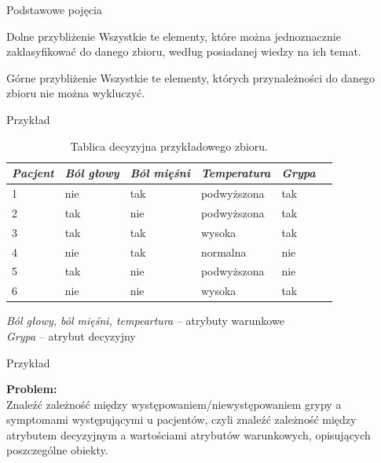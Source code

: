 \documentclass[10pt]{beamer}
\begin{document}
\begin{frame}{Podstawowe pojęcia}
\begin{spacing}{1.2}
\begin{block}{Dolne przybliżenie}
Wszystkie te elementy, które można jednoznacznie zaklasyfikować do danego zbioru, według posiadanej wiedzy na ich temat.
\end{block}

\begin{block}{Górne przybliżenie}
Wszystkie te elementy, których przynależności do danego zbioru nie można wykluczyć.
\end{block}

\end{spacing}
\end{frame}


\begin{frame}{Przykład}
\begin{center}
\begin{table}
\begin{tabular}{|k{1.2cm}|k{1.8cm}|k{1.8cm}|k{2.2cm}|k{1.4cm}|@{}m{0pt}@{}}
\hline
\textit{Pacjent} & \textit{Ból głowy} & \textit{Ból mięśni} & \textit{Temperatura} &  \textit{Grypa} &\\[1ex]
 & nie & tak & podwyższona & tak &\\[1ex]
2 & tak & nie & podwyższona & tak &\\[1ex]
3 & tak & tak & wysoka & tak &\\[1ex]
4 & nie & tak & normalna & nie &\\[1ex]
5 & tak & nie & podwyższona & nie &\\[1ex]
6 & nie & nie & wysoka & tak &\\[1ex]
\hline
\end{tabular}
\caption{Tablica decyzyjna przykładowego zbioru.}
\end{table}

\end{center}
\begin{flushleft}
\textit{Ból głowy, ból mięśni, tempeartura} -- atrybuty warunkowe\\
\textit{Grypa} -- atrybut decyzyjny
\end{flushleft}
\end{frame}


\begin{frame}{Przykład}
\begin{spacing}{1.5}
\textbf{Problem:}\\
Znaleźć zależność między występowaniem/niewystępowaniem grypy a symptomami występującymi u pacjentów, czyli znaleźć zależność między atrybutem decyzyjnym a wartościami atrybutów warunkowych, opisujących poszczególne obiekty.
\end{spacing}
\end{frame}
\end{document}
